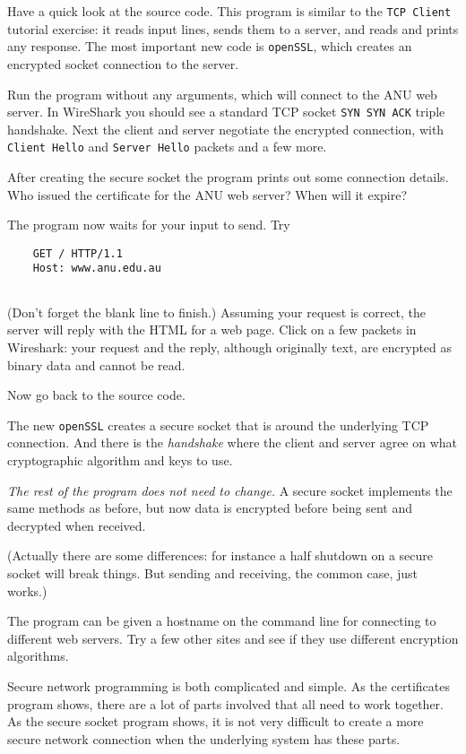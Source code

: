 Have a quick look at the source code. This program is similar to the
\texttt{TCP Client}
tutorial exercise: it reads input lines, sends them to a server, and reads and
prints any response. The most important new code is \texttt{openSSL}, which
creates an encrypted socket connection to the server.

Run the program without any arguments, which will connect to the ANU web server.
In WireShark you should see a standard TCP socket
\texttt{SYN SYN ACK} triple handshake.
Next the client and server negotiate the encrypted connection, with
\texttt{Client Hello} and \texttt{Server Hello} packets and a few more.

After creating the secure socket the program prints out some connection details.
Who issued the certificate for the ANU web server? When will it expire?

The program now waits for your input to send. Try
\begin{CODE}\begin{verbatim}
    GET / HTTP/1.1
    Host: www.anu.edu.au
    
\end{verbatim}\end{CODE}

(Don't forget the blank line to finish.)
Assuming your request is correct, the server will reply with the HTML for a web
page. Click on a few packets in Wireshark: your request and the reply, although
originally text, are encrypted as binary data and cannot be read.

Now go back to the source code.

The new \texttt{openSSL} creates a secure socket that is  around the
underlying TCP connection. And there is the \emph{handshake} where the client and
server agree on what cryptographic algorithm and keys to use.

\emph{The rest of the program does not need to change.} A secure socket implements
the same methods as before, but now data is encrypted before being sent and
decrypted when received.

(Actually there are some differences: for instance a half shutdown on a secure
socket will break things. But sending and receiving, the common case, just works.)

The program can be given a hostname on the command line for connecting to
different web servers. Try a few other sites and see if they use different
encryption algorithms.

Secure network programming is both complicated and simple. As the certificates
program shows, there are a lot of parts involved that all need to work together.
As the secure socket program shows, it is not very difficult to create a more
secure network connection when the underlying system has these parts.


\COPYRIGHT


